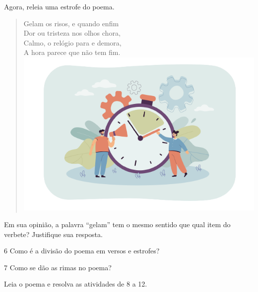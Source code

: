 Agora, releia uma estrofe do poema.

\begin{myquote}
\begin{verse}
Gelam os risos, e quando enfim\\
Dor ou tristeza nos olhos chora,\\
Calmo, o relógio para e demora,\\
A hora parece que não tem fim.\\

\includegraphics[width=.6\textwidth]{./media/image14b.png}
\end{verse}
\end{myquote}

Em sua opinião, a palavra ``gelam'' tem o mesmo sentido que qual item do verbete? Justifique sua resposta.


\num{6} Como é a divisão do poema em versos e estrofes?


\num{7} Como se dão as rimas no poema?


Leia o poema e resolva as atividades de 8 a 12.



